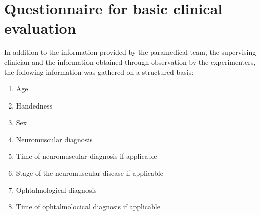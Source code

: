 \section{Questionnaire for basic clinical evaluation}
\label{app:clinical-questions}

In addition to the information provided by the paramedical team, the supervising clinician
and the information obtained through observation by the experimenters, the following
information was gathered on a structured basis:
\begin{enumerate}
\item Age
\item Handedness
\item Sex
\item Neuromuscular diagnosis
\item Time of neuromuscular diagnosis if applicable
\item Stage of the neuromuscular disease if applicable
\item Ophtalmological diagnosis
\item Time of ophtalmolocical diagnosis if applicable
\end{enumerate}
